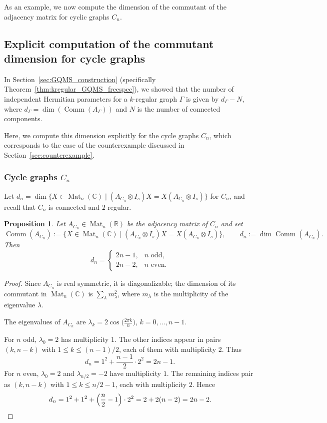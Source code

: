 \documentclass[11pt, a4paper]{article}
\theoremstyle{plain}
\newtheorem{proposition}[theorem]{Proposition}
\theoremstyle{definition}
\theoremstyle{remark}
\newcommand{\R}{\mathbb{R}}
\newcommand{\C}{\mathbb{C}}
\begin{document}
\bigskip
\noindent
As an example, we now compute the dimension of the commutant of the adjacency matrix
for cyclic graphs \(C_n\).


\subsection{Explicit computation of the commutant dimension for cycle graphs}
\label{sec:commutant-dimension}

In Section~\ref{sec:GQMS_construction} (specifically Theorem~\ref{thm:kregular_GQMS_freespec}), we showed that the number of independent Hermitian parameters for a \(k\)-regular graph \(\Gamma\) is given by \(d_\Gamma - N\), where \(d_\Gamma = \dim(\operatorname{Comm}(A_\Gamma))\) and \(N\) is the number of connected components.

Here, we compute this dimension explicitly for the cycle graphs \(C_n\), which corresponds to the case of the counterexample discussed in Section~\ref{sec:counterexample}.

\subsubsection{Cycle graphs \(C_n\)}

Let \(d_n=\dim\{X\in \operatorname{Mat}_n(\C)\mid (A_{C_n}\otimes I_s)X=X(A_{C_n}\otimes I_s)\}\) for \(C_n\), and recall that \(C_n\) is connected and \(2\)-regular.

\begin{proposition}
Let \(A_{C_n}\in \operatorname{Mat}_n(\R)\) be the adjacency matrix of \(C_n\) and set
\[
\operatorname{Comm}(A_{C_n}) := \{ X \in \operatorname{Mat}_n(\C) \mid (A_{C_n}\otimes I_s)X = X(A_{C_n}\otimes I_s) \},
\qquad
d_n := \dim\operatorname{Comm}(A_{C_n}).
\]
Then
\[
d_n =
\begin{cases}
2n - 1, & \text{\(n\) odd},\\[1mm]
2n - 2, & \text{\(n\) even}.
\end{cases}
\]
\end{proposition}

\begin{proof}
Since \(A_{C_n}\) is real symmetric, it is diagonalizable; the dimension of its
commutant in \(\operatorname{Mat}_n(\C)\) is \(\sum_{\lambda} m_\lambda^2\), where \(m_\lambda\) is
the multiplicity of the eigenvalue \(\lambda\).

The eigenvalues of \(A_{C_n}\) are
\(\lambda_k = 2\cos\!\bigl(\tfrac{2\pi k}{n}\bigr)\), \(k=0,\dots,n-1\).


For \(n\) odd, \(\lambda_0=2\) has multiplicity \(1\). The other indices
appear in pairs \((k,n-k)\) with \(1\le k\le (n-1)/2\), each of them with multiplicity \(2\).
Thus
\[
d_n = 1^2 + \frac{n-1}{2}\cdot 2^2 = 2n-1.
\]
For \(n\) even, \(\lambda_0=2\) and \(\lambda_{n/2}=-2\) have multiplicity \(1\). The remaining indices
pair as \((k,n-k)\) with \(1\le k\le n/2-1\), each with multiplicity \(2\).
Hence
\[
d_n = 1^2 + 1^2 + \Bigl(\frac{n}{2}-1\Bigr)\cdot 2^2
= 2 + 2(n-2) = 2n-2.
\]
\end{proof}
\end{document}
